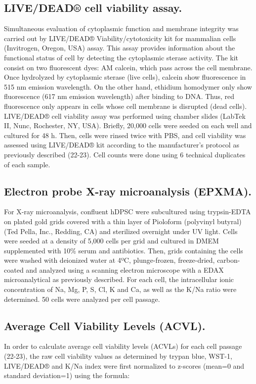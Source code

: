 \documentclass[a4paper,12pt]{article}
\begin{document}
\subsection{LIVE/DEAD® cell viability assay.}
Simultaneous evaluation of cytoplasmic function and membrane integrity was carried out by LIVE/DEAD® Viability/cytotoxicity kit for mammalian cells (Invitrogen, Oregon, USA) assay. This assay provides information about the functional status of cell by detecting the cytoplasmic sterase activity. The kit consist on two fluorescent dyes: AM calcein, which pass across the cell membrane. Once hydrolyzed by cytoplasmic sterase (live cells), calcein show fluorescence in 515 nm emission wavelength. On the other hand, ethidium homodymer only show fluorescence (617 nm emission wavelength) after binding to DNA. Thus, red fluorescence only appears in cells whose cell membrane is disrupted (dead cells). LIVE/DEAD® cell viability assay was performed using chamber slides (LabTek II, Nunc, Rochester, NY, USA). Briefly, 20,000 cells were seeded on each well and cultured for 48 h. Then, cells were rinsed twice with PBS, and cell viability was assessed using LIVE/DEAD® kit according to the manufacturer’s protocol as previously described (22-23). Cell counts were done using 6 technical duplicates of each sample.\\
\subsection{Electron probe X-ray microanalysis (EPXMA).}
For X-ray microanalysis, confluent hDPSC were subcultured using trypsin-EDTA on plated gold grids covered with a thin layer of Pioloform (polyvinyl butyral) (Ted Pella, Inc., Redding, CA) and sterilized overnight under UV light. Cells were seeded at a density of 5,000 cells per grid and cultured in DMEM supplemented with 10\% serum and antibiotics. Then, grids containing the cells were washed with deionized water at 4ºC, plunge-frozen, freeze-dried, carbon-coated and analyzed using a scanning electron microscope with a EDAX microanalytical as previously described. For each cell, the intracellular ionic concentration of Na, Mg, P, S, Cl, K and Ca, as well as the K/Na ratio were determined. 50 cells were analyzed per cell passage.
\subsection{Average Cell Viability Levels (ACVL).}
In order to calculate average cell viability levels (ACVLs) for each cell passage (22-23), the raw cell viability values as determined by trypan blue, WST-1, LIVE/DEAD® and K/Na index were first normalized to z-scores (mean=0 and standard deviation=1) using the formula: 
\end{document}
